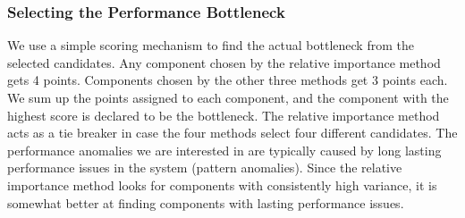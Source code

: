 \subsubsection{Selecting the Performance Bottleneck}


We use a simple scoring mechanism to
find the actual bottleneck from the selected candidates. 
Any component chosen by the relative importance
method gets 4 points. Components chosen by the other three methods get 3 points each. 
We sum up the points assigned to each component, and the component with the highest
score is declared to be the bottleneck. The relative importance method acts as a tie breaker
in case the four methods select four different candidates. The performance anomalies we
are interested in are typically caused by long lasting performance issues in the system 
(pattern anomalies). Since the relative importance method looks for components with
consistently high variance, it is somewhat better at finding components
with lasting performance issues.
